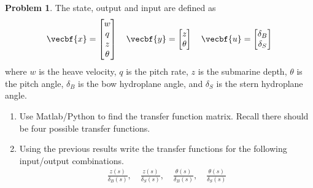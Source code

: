 \documentclass[10pt]{article}
\theoremstyle{definition}
\newtheorem{prob}{Problem}[section]
\newenvironment{subprob}%
{\renewcommand{\theenumi}{\alph{enumi}}\renewcommand{\labelenumi}{(\theenumi)}\begin{enumerate}}%
{\end{enumerate}}%
\begin{document}
\begin{prob}
    The state, output and input are defined as
    \begin{align*}
        \vecbf{x} = \begin{bmatrix}
            w \\ q \\ z \\ \theta
        \end{bmatrix}
        \quad
        \vecbf{y} = \begin{bmatrix} z \\ \theta \end{bmatrix} \quad \vecbf{u} = \begin{bmatrix} \delta_B \\ \delta_S \end{bmatrix}
    \end{align*}
    where \( w\) is the heave velocity, \( q \) is the pitch rate, \( z \) is the submarine depth, \( \theta\) is the pitch angle, \( \delta_B\) is the bow hydroplane angle, and \( \delta_S\) is the stern hydroplane angle.

    \begin{subprob}
        \item Use Matlab/Python to find the transfer function matrix. 
            Recall there should be four possible transfer functions.
        \item Using the previous results write the transfer functions for the following input/output combinations.
            \begin{align*}
                \frac{z(s)}{\delta_B(s)} ,\quad \frac{z(s)}{\delta_S(s)} ,\quad \frac{\theta(s)}{\delta_B(s)} ,\quad \frac{\theta(s)}{\delta_S(s)}
            \end{align*}
    \end{subprob}
\end{prob}
\end{document}
